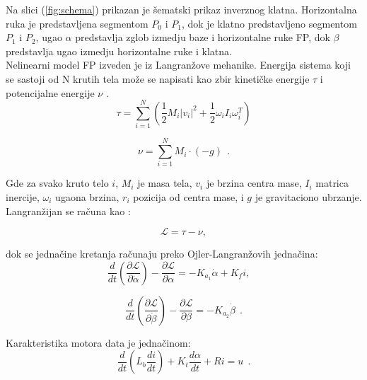 \documentclass[a4paper,11pt]{article}
\theoremstyle{definition} \newtheorem{deff}{Definicija}[section]
\theoremstyle{definition} \newtheorem{prim}[deff]{Primer}
\theoremstyle{plain} \newtheorem{teor}[deff]{Teorema}
\begin{document}
	
	Na slici (\ref{fig:schema}) prikazan je šematski prikaz inverznog klatna. Horizontalna ruka je predstavljena segmentom $P_0$ i $P_1$, dok je klatno predstavljeno segmentom $P_1$ i $P_2$, ugao $\alpha$ predstavlja zglob izmedju baze i horizontalne ruke FP, dok $\beta$ predstavlja ugao izmedju horizontalne ruke i klatna.
	\\
	
	Nelinearni model FP izveden je iz Langranžove mehanike. Energija sistema koji se sastoji od N krutih tela može se napisati kao zbir kinetičke energije $\tau$ i potencijalne energije $\nu$ \cite{inicijalna}. 
	\begin{equation}
		\tau = \sum_{i=1}^{N} \left( \frac{1}{2} M_i |v_i|^2 + \frac{1}{2} \omega_i I_i \omega_i^T \right)
	\end{equation}
	
	\begin{equation}
		\nu = \sum_{i=1}^{N} M_i \cdot (-g)~~.
	\end{equation}
	
	
	
	Gde za svako kruto telo $i$, $M_i$ je masa tela, $v_i$ je brzina centra mase, $I_i$ matrica inercije, $\omega_i$ ugaona brzina, $r_i$ pozicija od centra mase, i $g$ je gravitaciono ubrzanje.\\
	
	\newpage
	Langranžijan se računa kao :
	
	\begin{equation}
		\mathcal{L} = \tau - \nu, 
	\end{equation}
	
	dok se jednačine kretanja računaju preko Ojler-Langranžovih jednačina: 
	\begin{equation}
		\frac{d}{dt} \left(\frac{\partial \mathcal{L}}{\partial \dot\alpha}\right) - \frac{\partial \mathcal{L}}{\partial \alpha} = -K_{a_1} \dot\alpha + K_f i, \quad 
	\end{equation}
	
	\begin{equation}
		\frac{d}{dt} \left( \frac{\partial \mathcal{L}}{\partial \dot\beta} \right) - \frac{\partial \mathcal{L}}{\partial \beta} = -K_{a_2} \dot\beta~~.
	\end{equation}
	
	Karakteristika motora data je jednačinom: 
	\begin{equation}
		\frac{d}{dt} \left( L_b \frac{di}{dt} \right) + K_t \frac{d\alpha}{dt} + R i = u~~.
	\end{equation}
	
\end{document}
